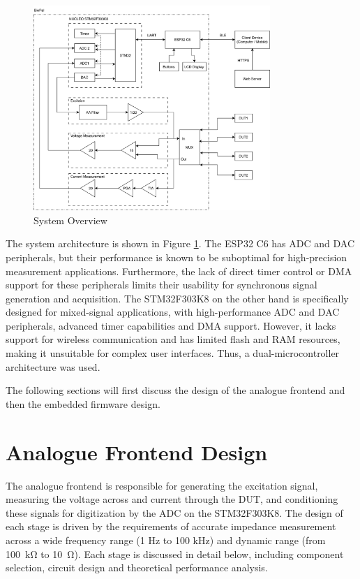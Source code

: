 
\begin{figure}[H]
    \centering
    \includegraphics[width=0.8\textwidth]{FullSystemOverview.png}
    \caption{System Overview}
    \label{fig:system_overview} 
\end{figure}

The system architecture is shown in Figure \ref{fig:system_overview}. The ESP32 C6 has \ac{ADC} and \ac{DAC} peripherals, but their performance is known to be suboptimal for high-precision measurement applications. Furthermore, the lack of direct timer control or \ac{DMA} support for these peripherals limits their usability for synchronous signal generation and acquisition. The STM32F303K8 on the other hand is specifically designed for mixed-signal applications, with high-performance \ac{ADC} and \ac{DAC} peripherals, advanced timer capabilities and \ac{DMA} support. However, it lacks support for wireless communication and has limited flash and RAM resources, making it unsuitable for complex user interfaces. Thus, a dual-microcontroller architecture was used.

The following sections will first discuss the design of the analogue frontend and then the embedded firmware design.
\section{Analogue Frontend Design}
The analogue frontend is responsible for generating the excitation signal, measuring the voltage across and current through the \ac{DUT}, and conditioning these signals for digitization by the \ac{ADC} on the STM32F303K8. The design of each stage is driven by the requirements of accurate impedance measurement across a wide frequency range (1 Hz to 100 kHz) and dynamic range (from \SI{100}{\kilo\ohm} to \SI{10}{\ohm}). Each stage is discussed in detail below, including component selection, circuit design and theoretical performance analysis.

